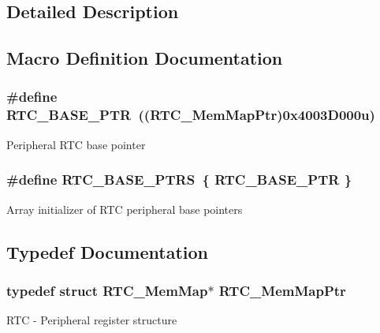 \subsection{Detailed Description}


\subsection{Macro Definition Documentation}
\hypertarget{group___r_t_c___peripheral_ga6455e2b767b4b224b4f00b50e87a2441}{}
\subsubsection[{R\+T\+C\+\_\+\+B\+A\+S\+E\+\_\+\+P\+T\+R}]{\setlength{\rightskip}{0pt plus 5cm}\#define R\+T\+C\+\_\+\+B\+A\+S\+E\+\_\+\+P\+T\+R~(({\bf R\+T\+C\+\_\+\+Mem\+Map\+Ptr})0x4003\+D000u)}\label{group___r_t_c___peripheral_ga6455e2b767b4b224b4f00b50e87a2441}
Peripheral R\+T\+C base pointer \hypertarget{group___r_t_c___peripheral_ga426dff8af34f3304d58b5bed5a54e583}{}
\subsubsection[{R\+T\+C\+\_\+\+B\+A\+S\+E\+\_\+\+P\+T\+R\+S}]{\setlength{\rightskip}{0pt plus 5cm}\#define R\+T\+C\+\_\+\+B\+A\+S\+E\+\_\+\+P\+T\+R\+S~\{ {\bf R\+T\+C\+\_\+\+B\+A\+S\+E\+\_\+\+P\+T\+R} \}}\label{group___r_t_c___peripheral_ga426dff8af34f3304d58b5bed5a54e583}
Array initializer of R\+T\+C peripheral base pointers 

\subsection{Typedef Documentation}
\hypertarget{group___r_t_c___peripheral_gac92da66fe1171e5751505df29917b152}{}
\subsubsection[{R\+T\+C\+\_\+\+Mem\+Map\+Ptr}]{\setlength{\rightskip}{0pt plus 5cm}typedef struct {\bf R\+T\+C\+\_\+\+Mem\+Map}$\ast$ {\bf R\+T\+C\+\_\+\+Mem\+Map\+Ptr}}\label{group___r_t_c___peripheral_gac92da66fe1171e5751505df29917b152}
R\+T\+C -\/ Peripheral register structure 